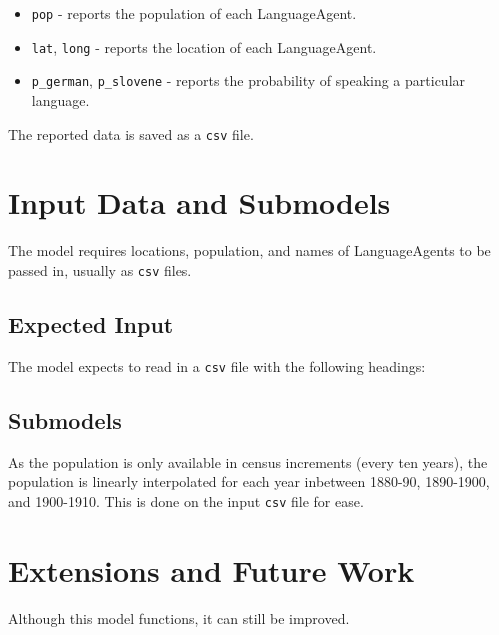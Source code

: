 \documentclass{article}
\begin{document}
\begin{itemize}
	\item \texttt{pop} - reports the population of each LanguageAgent.
	      	
	\item \texttt{lat}, \texttt{long} - reports the location of each LanguageAgent.
	      	
	\item \texttt{p\_german}, \texttt{p\_slovene} - reports the probability of speaking a particular language.
\end{itemize}

The reported data is saved as a \texttt{csv} file.

\section{Input Data and Submodels}
The model requires locations, population, and names of LanguageAgents to be passed in, usually as \texttt{csv} files.

\subsection{Expected Input}
The model expects to read in a \texttt{csv} file with the following headings:
\begin{table}[hp!]
\centering
\label{input_data}
\caption{Input data headings (\texttt{csv})}
\end{table}

\subsection{Submodels}
As the population is only available in census increments (every ten years), the population is linearly interpolated for each year inbetween 1880-90, 1890-1900, and 1900-1910. This is done on the input \texttt{csv} file for ease.


\section{Extensions and Future Work}
Although this model functions, it can still be improved.
\end{document}

